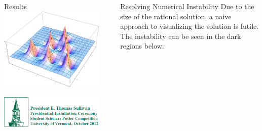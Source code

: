 \documentclass[final]{beamer}
\begin{document}
\begin{frame}{}
\begin{columns}[t]
\begin{column}{.35\linewidth}
\begin{block}{Results}
\vspace{3cm}
\centering
\includegraphics[width=700px]{3rd_order_many_peaks.png}
\\[1ex]

		\end{block}
	
\vspace{1cm}
  		
  		\includegraphics[width=1\linewidth]{SSPC_logo.pdf}

	\end{column}
	
	\begin{column}{.005\linewidth}	
\end{column}  

\begin{column}{.35\linewidth}
\begin{block}{Resolving Numerical Instability}
	Due to the size of the rational solution, a naive approach to visualizing the solution is futile. The instability can be seen in the dark regions below:
	

\end{block}
\end{column}
\end{columns}
\end{frame}
\end{document}
